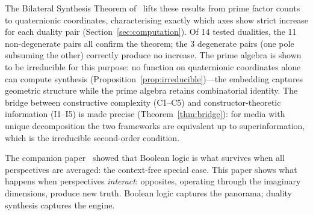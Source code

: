 \documentclass[11pt,a4paper]{article}
\begin{document}
The Bilateral Synthesis Theorem of~\citet{p11} lifts these
results from prime factor counts to quaternionic coordinates,
characterising exactly which axes show strict increase for each
duality pair (Section~\ref{sec:computation}). Of 14 tested
dualities, the 11 non-degenerate pairs all confirm the theorem;
the 3 degenerate pairs (one pole subsuming the other) correctly
produce no increase. The prime algebra is shown to be irreducible
for this purpose: no function on quaternionic coordinates alone
can compute synthesis
(Proposition~\ref{prop:irreducible})---the embedding captures
geometric structure while the prime algebra retains combinatorial
identity. The bridge between constructive complexity (C1--C5) and
constructor-theoretic information (I1--I5) is made precise
(Theorem~\ref{thm:bridge}): for media with unique decomposition
the two frameworks are equivalent up to superinformation, which
is the irreducible second-order condition.

The companion paper~\citep{p11} showed that Boolean logic is what
survives when all perspectives are averaged: the context-free
special case. This paper shows what happens when perspectives
\emph{interact}: opposites, operating through the imaginary
dimensions, produce new truth. Boolean logic captures the panorama;
duality synthesis captures the engine.
\end{document}

